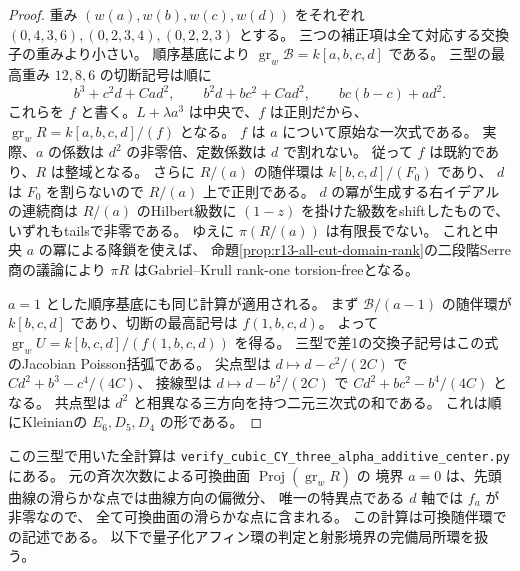 \begin{proof}
重み $(w(a),w(b),w(c),w(d))$ をそれぞれ
$(0,4,3,6),(0,2,3,4),(0,2,2,3)$ とする。
三つの補正項は全て対応する交換子の重みより小さい。
順序基底により $\operatorname{gr}_w\mathcal B=k[a,b,c,d]$ である。
三型の最高重み $12,8,6$ の切断記号は順に
\[
 b^3+c^2d+Ca d^2,\qquad b^2d+bc^2+Ca d^2,\qquad bc(b-c)+ad^2.
\]
これらを $f$ と書く。$L+\lambda a^3$ は中央で、$f$ は正則だから、
$\operatorname{gr}_w R=k[a,b,c,d]/(f)$ となる。
$f$ は $a$ について原始な一次式である。
実際、$a$ の係数は $d^2$ の非零倍、定数係数は $d$ で割れない。
従って $f$ は既約であり、$R$ は整域となる。
さらに $R/(a)$ の随伴環は $k[b,c,d]/(F_0)$ であり、
$d$ は $F_0$ を割らないので $R/(a)$ 上で正則である。
$d$ の冪が生成する右イデアルの連続商は
$R/(a)$ のHilbert級数に $(1-z)$ を掛けた級数をshiftしたもので、
いずれもtailsで非零である。
ゆえに $\pi(R/(a))$ は有限長でない。
これと中央 $a$ の冪による降鎖を使えば、
命題\ref{prop:r13-all-cut-domain-rank}の二段階Serre商の議論により
$\pi R$ はGabriel--Krull rank-one torsion-freeとなる。

$a=1$ とした順序基底にも同じ計算が適用される。
まず $\mathcal B/(a-1)$ の随伴環が $k[b,c,d]$ であり、切断の最高記号は $f(1,b,c,d)$。
よって $\operatorname{gr}_w U=k[b,c,d]/(f(1,b,c,d))$ を得る。
三型で差1の交換子記号はこの式のJacobian Poisson括弧である。
尖点型は $d\mapsto d-c^2/(2C)$ で $Cd^2+b^3-c^4/(4C)$、
接線型は $d\mapsto d-b^2/(2C)$ で $Cd^2+bc^2-b^4/(4C)$ となる。
共点型は $d^2$ と相異なる三方向を持つ二元三次式の和である。
これは順にKleinianの $E_6,D_5,D_4$ の形である。
\end{proof}

この三型で用いた全計算は
\texttt{verify\_cubic\_CY\_three\_alpha\_additive\_center.py} にある。
元の斉次次数による可換曲面 $\operatorname{Proj}(\operatorname{gr}_w R)$ の
境界 $a=0$ は、先頭曲線の滑らかな点では曲線方向の偏微分、
唯一の特異点である $d$ 軸では $f_a$ が非零なので、
全て可換曲面の滑らかな点に含まれる。
この計算は可換随伴環での記述である。
以下で量子化アフィン環の判定と射影境界の完備局所環を扱う。

